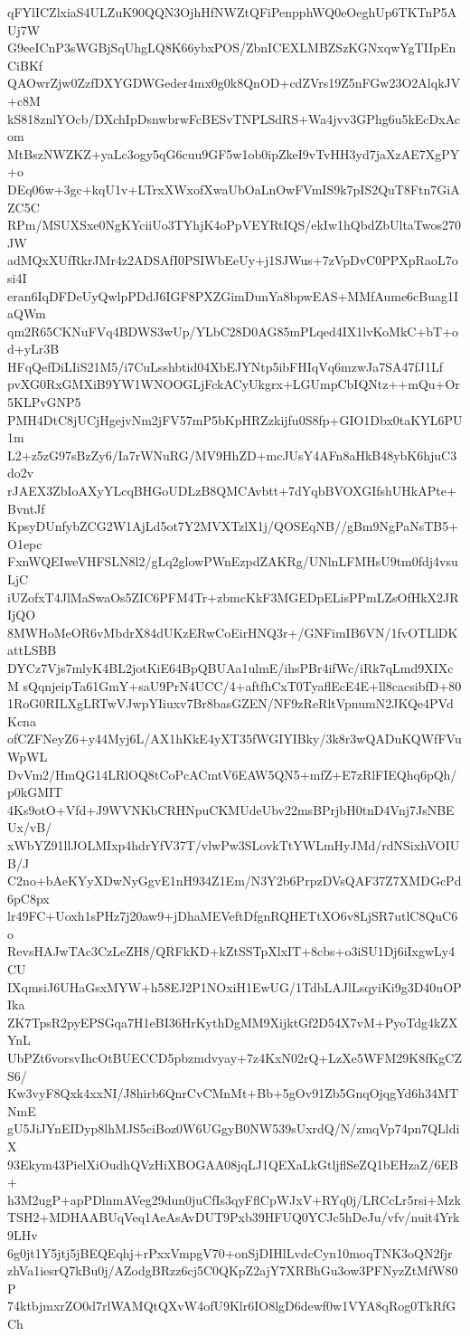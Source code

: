 qFYlICZlxiaS4ULZuK90QQN3OjhHfNWZtQFiPenpphWQ0eOeghUp6TKTnP5AUj7W
G9eeICnP3sWGBjSqUhgLQ8K66ybxPOS/ZbnICEXLMBZSzKGNxqwYgTIIpEnCiBKf
QAOwrZjw0ZzfDXYGDWGeder4mx0g0k8QnOD+cdZVrs19Z5nFGw23O2AlqkJV+c8M
kS818znlYOcb/DXchIpDsnwbrwFcBESvTNPLSdRS+Wa4jvv3GPhg6u5kEcDxAcom
MtBszNWZKZ+yaLc3ogy5qG6cuu9GF5w1ob0ipZkeI9vTvHH3yd7jaXzAE7XgPY+o
DEq06w+3gc+kqU1v+LTrxXWxofXwaUbOaLnOwFVmIS9k7pIS2QuT8Ftn7GiAZC5C
RPm/MSUXSxe0NgKYciiUo3TYhjK4oPpVEYRtIQS/ekIw1hQbdZbUltaTwos270JW
adMQxXUfRkrJMr4z2ADSAfI0PSIWbEeUy+j1SJWus+7zVpDvC0PPXpRaoL7osi4I
eran6IqDFDeUyQwlpPDdJ6IGF8PXZGimDunYa8bpwEAS+MMfAume6cBuag1IaQWm
qm2R65CKNuFVq4BDWS3wUp/YLbC28D0AG85mPLqed4IX1lvKoMkC+bT+od+yLr3B
HFqQefDiLIiS21M5/i7CuLsshbtid04XbEJYNtp5ibFHIqVq6mzwJa7SA47fJ1Lf
pvXG0RxGMXiB9YW1WNOOGLjFckACyUkgrx+LGUmpCbIQNtz++mQu+Or5KLPvGNP5
PMH4DtC8jUCjHgejvNm2jFV57mP5bKpHRZzkijfu0S8fp+GIO1Dbx0taKYL6PU1m
L2+z5zG97sBzZy6/Ia7rWNuRG/MV9HhZD+mcJUsY4AFn8aHkB48ybK6hjuC3do2v
rJAEX3ZbIoAXyYLcqBHGoUDLzB8QMCAvbtt+7dYqbBVOXGIfshUHkAPte+BvntJf
KpsyDUnfybZCG2W1AjLd5ot7Y2MVXTzlX1j/QOSEqNB//gBm9NgPaNsTB5+O1epc
FxnWQEIweVHFSLN8l2/gLq2glowPWnEzpdZAKRg/UNlnLFMHsU9tm0fdj4vsuLjC
iUZofxT4JlMaSwaOs5ZIC6PFM4Tr+zbmcKkF3MGEDpELisPPmLZsOfHkX2JRIjQO
8MWHoMeOR6vMbdrX84dUKzERwCoEirHNQ3r+/GNFimIB6VN/1fvOTLlDKattLSBB
DYCz7Vjs7mlyK4BL2jotKiE64BpQBUAa1ulmE/ihsPBr4ifWc/iRk7qLmd9XIXcM
sQqnjeipTa61GmY+saU9PrN4UCC/4+aftfhCxT0TyaflEcE4E+ll8cacsibfD+80
1RoG0RILXgLRTwVJwpYIiuxv7Br8basGZEN/NF9zReRltVpnumN2JKQe4PVdKcna
ofCZFNeyZ6+y44Myj6L/AX1hKkE4yXT35fWGIYIBky/3k8r3wQADuKQWfFVuWpWL
DvVm2/HmQG14LRlOQ8tCoPcACmtV6EAW5QN5+mfZ+E7zRlFIEQhq6pQh/p0kGMIT
4Ks9otO+Vfd+J9WVNKbCRHNpuCKMUdeUbv22msBPrjbH0tnD4Vnj7JsNBEUx/vB/
xWbYZ91llJOLMIxp4hdrYfV37T/vlwPw3SLovkTtYWLmHyJMd/rdNSixhVOIUB/J
C2no+bAeKYyXDwNyGgvE1nH934Z1Em/N3Y2b6PrpzDVsQAF37Z7XMDGcPd6pC8px
lr49FC+Uoxh1sPHz7j20aw9+jDhaMEVeftDfgnRQHETtXO6v8LjSR7utlC8QuC6o
RevsHAJwTAc3CzLeZH8/QRFkKD+kZtSSTpXlxIT+8cbs+o3iSU1Dj6iIxgwLy4CU
IXqmsiJ6UHaGsxMYW+h58EJ2P1NOxiH1EwUG/1TdbLAJlLsqyiKi9g3D40uOPIka
ZK7TpsR2pyEPSGqa7H1eBI36HrKythDgMM9XijktGf2D54X7vM+PyoTdg4kZXYnL
UbPZt6vorsvIhcOtBUECCD5pbzmdvyay+7z4KxN02rQ+LzXe5WFM29K8fKgCZS6/
Kw3vyF8Qxk4xxNI/J8hirb6QnrCvCMnMt+Bb+5gOv91Zb5GnqOjqgYd6h34MTNmE
gU5JiJYnEIDyp8lhMJS5ciBoz0W6UGgyB0NW539sUxrdQ/N/zmqVp74pn7QLldiX
93Ekym43PielXiOudhQVzHiXBOGAA08jqLJ1QEXaLkGtljflSeZQ1bEHzaZ/6EB+
h3M2ugP+apPDlnmAVeg29dun0juCfIs3qyFflCpWJxV+RYq0j/LRCcLr5rsi+Mzk
TSH2+MDHAABUqVeq1AeAsAvDUT9Pxb39HFUQ0YCJc5hDeJu/vfv/nuit4Yrk9LHv
6g0jt1Y5jtj5jBEQEqhj+rPxxVmpgV70+onSjDIHlLvdcCyn10moqTNK3oQN2fjr
zhVa1iesrQ7kBu0j/AZodgBRzz6cj5C0QKpZ2ajY7XRBhGu3ow3PFNyzZtMfW80P
74ktbjmxrZO0d7rlWAMQtQXvW4ofU9Klr6IO8lgD6dewf0w1VYA8qRog0TkRfGCh
